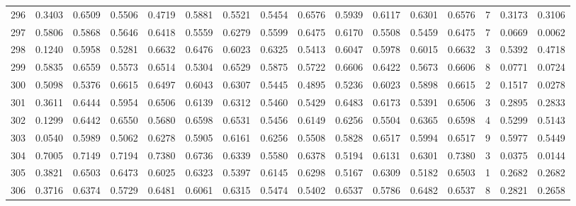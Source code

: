 \begin{tabular}{lrrrrrrrrrrrrrrr}
296 &      0.3403 &  0.6509 &  0.5506 &  0.4719 &  0.5881 &  0.5521 &  0.5454 &  0.6576 &  0.5939 &  0.6117 &   0.6301 &     0.6576 &      7 &                    0.3173 &                     0.3106 \\
297 &      0.5806 &  0.5868 &  0.5646 &  0.6418 &  0.5559 &  0.6279 &  0.5599 &  0.6475 &  0.6170 &  0.5508 &   0.5459 &     0.6475 &      7 &                    0.0669 &                     0.0062 \\
298 &      0.1240 &  0.5958 &  0.5281 &  0.6632 &  0.6476 &  0.6023 &  0.6325 &  0.5413 &  0.6047 &  0.5978 &   0.6015 &     0.6632 &      3 &                    0.5392 &                     0.4718 \\
299 &      0.5835 &  0.6559 &  0.5573 &  0.6514 &  0.5304 &  0.6529 &  0.5875 &  0.5722 &  0.6606 &  0.6422 &   0.5673 &     0.6606 &      8 &                    0.0771 &                     0.0724 \\
300 &      0.5098 &  0.5376 &  0.6615 &  0.6497 &  0.6043 &  0.6307 &  0.5445 &  0.4895 &  0.5236 &  0.6023 &   0.5898 &     0.6615 &      2 &                    0.1517 &                     0.0278 \\
301 &      0.3611 &  0.6444 &  0.5954 &  0.6506 &  0.6139 &  0.6312 &  0.5460 &  0.5429 &  0.6483 &  0.6173 &   0.5391 &     0.6506 &      3 &                    0.2895 &                     0.2833 \\
302 &      0.1299 &  0.6442 &  0.6550 &  0.5680 &  0.6598 &  0.6531 &  0.5456 &  0.6149 &  0.6256 &  0.5504 &   0.6365 &     0.6598 &      4 &                    0.5299 &                     0.5143 \\
303 &      0.0540 &  0.5989 &  0.5062 &  0.6278 &  0.5905 &  0.6161 &  0.6256 &  0.5508 &  0.5828 &  0.6517 &   0.5994 &     0.6517 &      9 &                    0.5977 &                     0.5449 \\
304 &      0.7005 &  0.7149 &  0.7194 &  0.7380 &  0.6736 &  0.6339 &  0.5580 &  0.6378 &  0.5194 &  0.6131 &   0.6301 &     0.7380 &      3 &                    0.0375 &                     0.0144 \\
305 &      0.3821 &  0.6503 &  0.6473 &  0.6025 &  0.6323 &  0.5397 &  0.6145 &  0.6298 &  0.5167 &  0.6309 &   0.5182 &     0.6503 &      1 &                    0.2682 &                     0.2682 \\
306 &      0.3716 &  0.6374 &  0.5729 &  0.6481 &  0.6061 &  0.6315 &  0.5474 &  0.5402 &  0.6537 &  0.5786 &   0.6482 &     0.6537 &      8 &                    0.2821 &                     0.2658 \\

\end{tabular}
